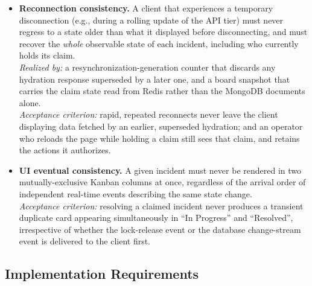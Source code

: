 \documentclass{scrartcl}
\begin{document}
\begin{itemize}
  \item[\textbf{NFR5}] \textbf{Reconnection consistency.} A client that experiences a temporary disconnection (e.g., during a rolling update of the API tier) must never regress to a state older than what it displayed before disconnecting, and must recover the \emph{whole} observable state of each incident, including who currently holds its claim. \\
  \emph{Realized by:} a resynchronization-generation counter that discards any hydration response superseded by a later one, and a board snapshot that carries the claim state read from Redis rather than the MongoDB documents alone. \\
  \emph{Acceptance criterion:} rapid, repeated reconnects never leave the client displaying data fetched by an earlier, superseded hydration; and an operator who reloads the page while holding a claim still sees that claim, and retains the actions it authorizes.

  \item[\textbf{NFR6}] \textbf{UI eventual consistency.} A given incident must never be rendered in two mutually-exclusive Kanban columns at once, regardless of the arrival order of independent real-time events describing the same state change. \\
  \emph{Acceptance criterion:} resolving a claimed incident never produces a transient duplicate card appearing simultaneously in ``In Progress'' and ``Resolved'', irrespective of whether the lock-release event or the database change-stream event is delivered to the client first.
\end{itemize}

\subsection{Implementation Requirements}\label{implementation-requirements}
\end{document}
